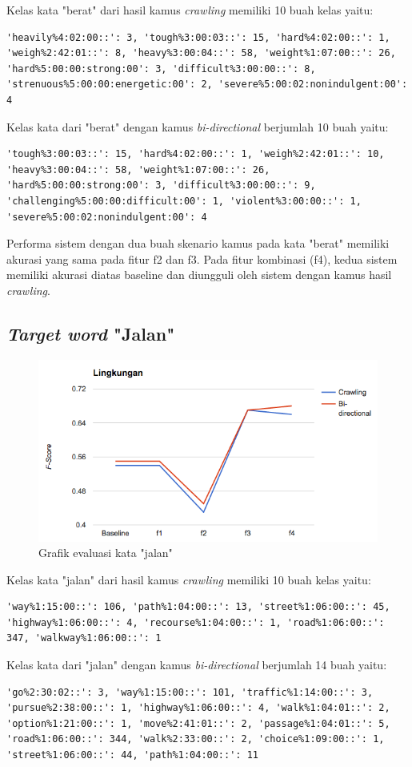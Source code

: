 Kelas kata "berat" dari hasil kamus \textit{crawling} memiliki 10 buah kelas yaitu:
\begin{lstlisting}
'heavily%4:02:00::': 3, 'tough%3:00:03::': 15, 'hard%4:02:00::': 1, 'weigh%2:42:01::': 8, 'heavy%3:00:04::': 58, 'weight%1:07:00::': 26, 'hard%5:00:00:strong:00': 3, 'difficult%3:00:00::': 8, 'strenuous%5:00:00:energetic:00': 2, 'severe%5:00:02:nonindulgent:00': 4
\end{lstlisting}
Kelas kata dari "berat" dengan kamus \textit{bi-directional} berjumlah 10 buah yaitu:
\begin{lstlisting}
'tough%3:00:03::': 15, 'hard%4:02:00::': 1, 'weigh%2:42:01::': 10, 'heavy%3:00:04::': 58, 'weight%1:07:00::': 26, 'hard%5:00:00:strong:00': 3, 'difficult%3:00:00::': 9, 'challenging%5:00:00:difficult:00': 1, 'violent%3:00:00::': 1, 'severe%5:00:02:nonindulgent:00': 4
\end{lstlisting}

Performa sistem dengan dua buah skenario kamus pada kata "berat" memiliki akurasi yang sama pada fitur f2 dan f3. Pada fitur kombinasi (f4), kedua sistem memiliki akurasi diatas baseline dan diungguli oleh sistem dengan kamus hasil \textit{crawling}.

\subsection{\textit{Target word} "Jalan"}

\begin{figure}
	\centering
	\includegraphics[width=1\linewidth]{adit_pics/lingkungan.png}
	\caption{Grafik evaluasi kata "jalan"}
	\label{fig:jalan}
\end{figure}

Kelas kata "jalan" dari hasil kamus \textit{crawling} memiliki 10 buah kelas yaitu:
\begin{lstlisting}
'way%1:15:00::': 106, 'path%1:04:00::': 13, 'street%1:06:00::': 45, 'highway%1:06:00::': 4, 'recourse%1:04:00::': 1, 'road%1:06:00::': 347, 'walkway%1:06:00::': 1
\end{lstlisting}
Kelas kata dari "jalan" dengan kamus \textit{bi-directional} berjumlah 14 buah yaitu:
\begin{lstlisting}
'go%2:30:02::': 3, 'way%1:15:00::': 101, 'traffic%1:14:00::': 3, 'pursue%2:38:00::': 1, 'highway%1:06:00::': 4, 'walk%1:04:01::': 2, 'option%1:21:00::': 1, 'move%2:41:01::': 2, 'passage%1:04:01::': 5, 'road%1:06:00::': 344, 'walk%2:33:00::': 2, 'choice%1:09:00::': 1, 'street%1:06:00::': 44, 'path%1:04:00::': 11
\end{lstlisting}


